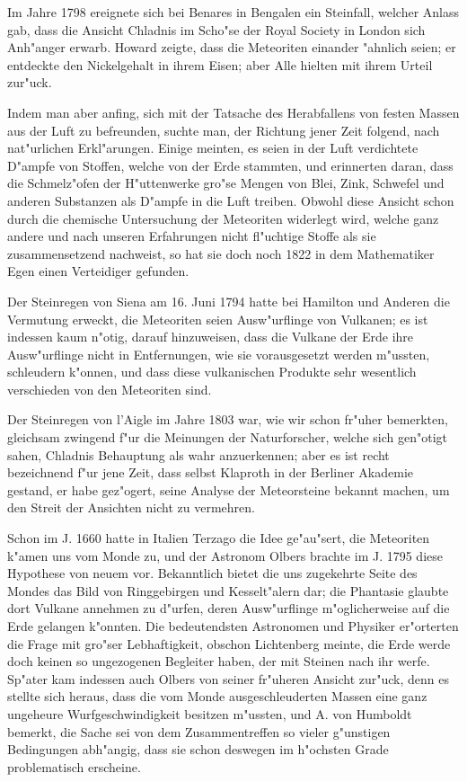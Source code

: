 \documentclass[a4paper, 11pt, oneside]{article}
\begin{document}
Im Jahre 1798 ereignete sich bei Benares in Bengalen ein Steinfall, welcher Anlass gab, dass die Ansicht Chladnis im Scho"se der Royal Society in London sich Anh"anger erwarb. Howard zeigte, dass die Meteoriten einander "ahnlich seien; er entdeckte den Nickelgehalt in ihrem Eisen; aber Alle hielten mit ihrem Urteil zur"uck.

Indem man aber anfing, sich mit der Tatsache des Herabfallens von festen Massen aus der Luft zu befreunden, suchte man, der Richtung jener Zeit folgend, nach nat"urlichen Erkl"arungen. Einige meinten, es seien in der Luft verdichtete D"ampfe von Stoffen, welche von der Erde stammten, und erinnerten daran, dass die Schmelz"ofen der H"uttenwerke gro"se Mengen von Blei, Zink, Schwefel und anderen Substanzen als D"ampfe in die Luft treiben. Obwohl diese Ansicht schon durch die chemische Untersuchung der Meteoriten widerlegt wird, welche ganz andere und nach unseren Erfahrungen nicht fl"uchtige Stoffe als sie zusammensetzend nachweist, so hat sie doch noch 1822 in dem Mathematiker Egen einen Verteidiger gefunden.

Der Steinregen von Siena am 16. Juni 1794 hatte bei Hamilton und Anderen die Vermutung erweckt, die Meteoriten seien Ausw"urflinge von Vulkanen; es ist indessen kaum n"otig, darauf hinzuweisen, dass die Vulkane der Erde ihre Ausw"urflinge nicht in Entfernungen, wie sie vorausgesetzt werden m"ussten, schleudern k"onnen, und dass diese vulkanischen Produkte sehr wesentlich verschieden von den Meteoriten sind.

Der Steinregen von l'Aigle im Jahre 1803 war, wie wir schon fr"uher bemerkten, gleichsam zwingend f"ur die Meinungen der Naturforscher, welche sich gen"otigt sahen, Chladnis Behauptung als wahr anzuerkennen; aber es ist recht bezeichnend f"ur jene Zeit, dass selbst Klaproth in der Berliner Akademie gestand, er habe gez"ogert, seine Analyse der Meteorsteine bekannt machen, um den Streit der Ansichten nicht zu vermehren.

Schon im J. 1660 hatte in Italien Terzago die Idee ge"au"sert, die Meteoriten k"amen uns vom Monde zu, und der Astronom Olbers brachte im J. 1795 diese Hypothese von neuem vor. Bekanntlich bietet die uns zugekehrte Seite des Mondes das Bild von Ringgebirgen und Kesselt"alern dar; die Phantasie glaubte dort Vulkane annehmen zu d"urfen, deren Ausw"urflinge m"oglicherweise auf die Erde gelangen k"onnten. Die bedeutendsten Astronomen und Physiker er"orterten die Frage mit gro"ser Lebhaftigkeit, obschon Lichtenberg meinte, die Erde werde doch keinen so ungezogenen Begleiter haben, der mit Steinen nach ihr werfe. Sp"ater kam indessen auch Olbers von seiner fr"uheren Ansicht zur"uck, denn es stellte sich heraus, dass die vom Monde ausgeschleuderten Massen eine ganz ungeheure Wurfgeschwindigkeit besitzen m"ussten, und A. von Humboldt bemerkt, die Sache sei von dem Zusammentreffen so vieler g"unstigen Bedingungen abh"angig, dass sie schon deswegen im h"ochsten Grade problematisch erscheine.
\end{document}
